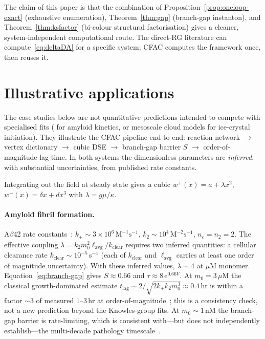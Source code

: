 \documentclass[11pt,a4paper]{article}
\newcommand{\ee}{\mathrm{e}}
\theoremstyle{plain}
\begin{document}
The claim of this paper is that the combination of
Proposition~\ref{prop:oneloop-exact} (exhaustive enumeration),
Theorem~\ref{thm:gap} (branch-gap instanton), and
Theorem~\ref{thm:ksfactor} (bi-colour structural factorisation)
gives a cleaner, system-independent computational route.  The
direct-RG literature can compute~\eqref{eq:deltaDA} for a
specific system; CFAC computes the framework once, then reuses it.

\section{Illustrative applications}
\label{sec:applications}

The case studies below are not quantitative predictions intended
to compete with specialised fits (\cite{Meisl2014} for amyloid
kinetics, or mesoscale cloud models for ice-crystal initiation).
They illustrate the CFAC pipeline end-to-end: reaction network
$\to$ vertex dictionary $\to$ cubic DSE $\to$ branch-gap barrier
$S$ $\to$ order-of-magnitude lag time.  In both systems the
dimensionless parameters are \emph{inferred}, with substantial
uncertainties, from published rate constants.

Integrating out the field at steady state gives a cubic
$w^+(x) = a + \lambda x^2$, $w^-(x) = \delta x + dx^3$ with
$\lambda = g\mu/\kappa$.

\paragraph{Amyloid fibril formation.}
A$\beta$42 rate constants~\citep{Cohen2013,Meisl2014}:
$k_+ \sim 3{\times}10^6\,\text{M}^{-1}\text{s}^{-1}$,
$k_2 \sim 10^4\,\text{M}^{-2}\text{s}^{-1}$, $n_c = n_2 = 2$.
The effective coupling $\lambda = k_2 m_0^2
\ell_{\mathrm{avg}}/k_{\mathrm{clear}}$ requires two inferred
quantities: a cellular clearance rate $k_{\mathrm{clear}} \sim
10^{-5}$\,s$^{-1}$ (each of $k_{\mathrm{clear}}$ and
$\ell_{\mathrm{avg}}$ carries at least one order of magnitude
uncertainty).  With these inferred values, $\lambda \sim 4$ at
$\mu$M monomer.  Equation~\eqref{eq:branch-gap} gives
$S \approx 0.66$ and $\tau \approx 8\,\ee^{0.66 V}$.  At $m_0 = 3\,\mu$M
the classical growth-dominated estimate
$t_{\mathrm{lag}} \sim 2/\sqrt{2 k_+ k_2 m_0^3} \approx 0.4$\,hr
is within a factor $\sim 3$ of measured $1$--$3$\,hr at
order-of-magnitude~\citep{Meisl2014}; this is a consistency
check, not a new prediction beyond the Knowles-group fits.  At
$m_0 \sim 1$\,nM the branch-gap barrier is rate-limiting, which
is consistent with---but does not independently establish---the
multi-decade pathology timescale~\citep{Knowles2009}.
\end{document}
